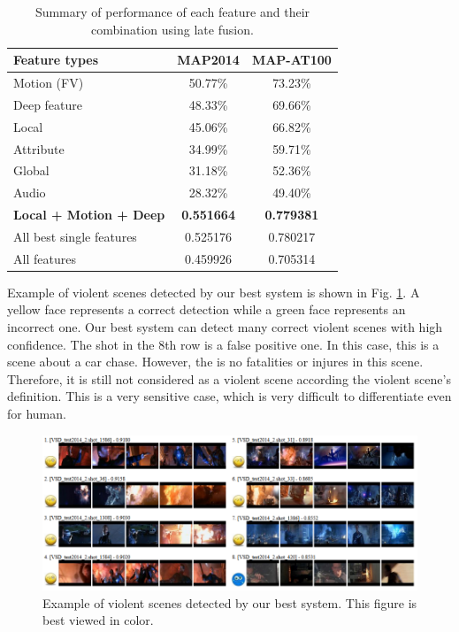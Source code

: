 \documentclass[twocolumn]{bmcart}%
\begin{document}
\begin{table}
	\centering
	\caption{Summary of performance of each feature and their combination using late fusion.}
	\begin{tabular}{lcc}
		\hline
		Feature types & MAP2014 & MAP-AT100 \\ \hline
		Motion (FV) & 50.77\% & 73.23\% \\
		Deep feature & 48.33\% & 69.66\% \\
		Local & 45.06\% & 66.82\% \\
		Attribute & 34.99\% & 59.71\% \\
		Global & 31.18\% & 52.36\% \\
		Audio & 28.32\% & 49.40\% \\  \hline
		\textbf{Local + Motion + Deep} & \textbf{0.551664}& \textbf{0.779381} \\
		All best single features & 0.525176 & 0.780217 \\
		All features & 0.459926 & 0.705314 \\ \hline
	\end{tabular}%
	\label{tab:summary}%
\end{table}%
Example of violent scenes detected by our best system is shown in Fig. \ref{fig:bestdemo}. A yellow face represents a correct detection while a green face represents an incorrect one. Our best system can detect many correct violent scenes with high confidence. The shot in the 8th row is a false positive one. In this case, this is a scene about a car chase. However, the is no fatalities or injures in this scene. Therefore, it is still not considered as a violent scene according the violent scene's definition. This is a very sensitive case, which is very difficult to differentiate even for human. 

\begin{figure}
	\centering
	\includegraphics[width=2\linewidth]{Images/BestRun_shot8th_CarChase_NoInjure.png}
	\caption{Example of violent scenes detected by our best system. This figure is best viewed in color.}
	\label{fig:bestdemo}
\end{figure}
\end{document}

